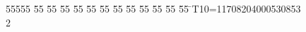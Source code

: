 %
%
\begin{tabbing}
55555 \= 55 \= 55 \= 55 \= 55 \= 55 \= 55 \= 55 \= 55 \= 55 \= 55 \= 55 \= 55 \= \>T10=11708204000530853\\[0pt]
2\>\end{tabbing}
